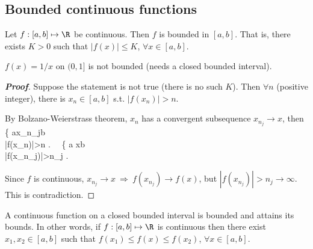 \subsection{Bounded continuous functions}




\begin{theorem}\label{thm:continuous_on_bounded_set_is_bounded}
Let $f: [a,b]\mapsto \R$ be continuous. Then $f$ is bounded in $[a,b]$. That is, there exists $K>0$ such that $|f(x)|\leq K$, $\forall x\in[a,b]$.
\end{theorem}

\begin{remark}
$f(x)=1/x$ on $(0,1]$ is not bounded (needs a closed bounded interval).
\end{remark}

\begin{proof}[{\bf Proof}]
Suppose the statement is not true (there is no such $K$). Then $\forall n$ (positive integer), there is $x_n\in [a,b]$ s.t. $|f(x_n)|>n$.

By Bolzano-Weierstrass theorem, $x_n$ has a convergent subsequence $x_{n_j}\to x$, then
\bea
\left\{
a\leq x_{n_j}\leq b \\
|f(x_n)|>n
\ea\right. \ \Rightarrow \
\left\{
a \leq x\leq b \\
|f(x_{n_j})|>n_j \to \infty
\ea\right.
\eea

Since $f$ is continuous, $x_{n_j}\to x \ \Rightarrow \ f(x_{n_j})\to f(x)$, but $|f(x_{n_j})|>n_j \to \infty$. This is contradiction.
\end{proof}

\begin{theorem}\label{thm:continuous_real_with_closed_bound_interval_attains_bounds}%
A continuous function on a closed bounded interval is bounded and attains its bounds. In other words, if $f: [a,b]\mapsto \R$ is continuous then there exist $x_1,x_2\in [a,b]$ such that $f(x_1)\leq f(x) \leq f(x_2)$, $\forall x\in[a,b]$.
\end{theorem}

